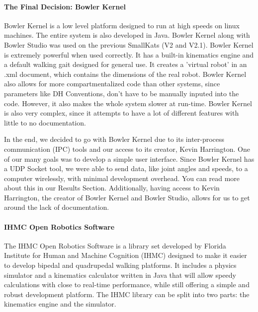 \paragraph*{The Final Decision: Bowler Kernel}
Bowler Kernel is a low level platform designed to run at high speeds on linux machines. The entire system is also developed in Java. Bowler Kernel along with Bowler Studio was used on the previous SmallKats (V2 and V2.1). Bowler Kernel is extremely powerful when used correctly. It has a built-in kinematics engine and a default walking gait designed for general use. It creates a 'virtual robot' in an .xml document, which contains the dimensions of the real robot. Bowler Kernel also allows for more compartmentalized code than other systems, since parameters like DH Conventions, don't have to be manually inputed into the code. However, it also makes the whole system slower at run-time. Bowler Kernel is also very complex, since it attempts to have a lot of different features with little to no documentation.

In the end, we decided to go with Bowler Kernel due to its inter-process communication (IPC) tools and our access to its creator, Kevin Harrington. One of our many goals was to develop a simple user interface. Since Bowler Kernel has a UDP Socket tool, we were able to send data, like joint angles and speeds, to a computer wirelessly, with minimal development overhead. You can read more about this in our Results Section. Additionally, having access to Kevin Harrington, the creator of Bowler Kernel and Bowler Studio, allows for us to get around the lack of documentation.

\paragraph*{IHMC Open Robotics Software}
The IHMC Open Robotics Software is a library set developed by Florida Institute for Human and Machine Cognition (IHMC) designed to make it easier to develop bipedal and quadrupedal walking platforms. It includes a physics simulator and a kinematics calculator written in Java that will allow speedy calculations with close to real-time performance, while still offering a simple and robust development platform. The IHMC library can be split into two parts: the kinematics engine and the simulator.

